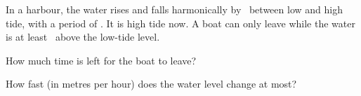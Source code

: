 In a harbour, the water rises and falls harmonically by \dHO\ between low and high tide, with a period of \TO. It is high tide now. A boat can only leave while the water is at least \hbO\ above the low-tide level.

\begin{abcliste}
\abc
How much time is left for the boat to leave?

\abc
How fast (in metres per hour) does the water level change at most?
\end{abcliste}
